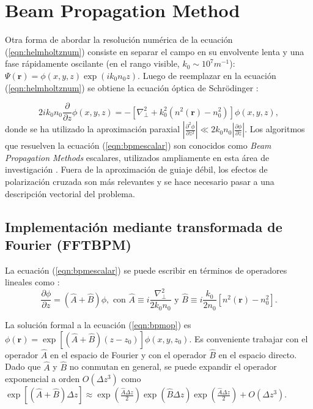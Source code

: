 \section{Beam Propagation Method} 

Otra forma de abordar la resolución numérica de la ecuación (\ref{eqn:helmholtznum}) consiste en separar el campo en su envolvente lenta y una fase rápidamente oscilante (en el rango visible, $k_0 \sim 10 ^{7} m^{-1}$): $\Psi(\textbf{r}) = \phi(x,y,z)\exp(ik_0 n_0 z)$. Luego de reemplazar en la ecuación (\ref{eqn:helmholtznum}) se obtiene la ecuación óptica de Schrödinger \citep{paraxialschrodinger}:

\begin{equation}
	2ik_0 n_0\frac{\partial }{\partial z}\phi(x,y, z) = - \left[\nabla_\perp^2 + k_0^2 (n^2(\textbf{r})-n_0^2)\right]\phi(x,y, z), \label{eqn:bpmescalar}
\end{equation} 
donde se ha utilizado la aproximación paraxial $\left| \frac{\partial^2 \phi}{\partial z^2} \right| \ll 2 k_0 n_0\left| \frac{\partial \phi}{\partial z} \right|$. Los algoritmos que resuelven la ecuación (\ref{eqn:bpmescalar}) son conocidos como \textit{Beam Propagation Methods} escalares, utilizados ampliamente en esta área de investigación \cite{bics, interorbital, OAMCaging, vortex, bpm}. Fuera de la aproximación de guiaje débil, los efectos de polarización cruzada son más relevantes y se hace necesario pasar a una descripción vectorial del problema.
\subsection{Implementación mediante transformada de Fourier (FFTBPM)}
La ecuación (\ref{eqn:bpmescalar}) se puede escribir en términos de operadores lineales como \citep{bpm}: 
\begin{equation}
	\frac{\partial \phi}{\partial z}  = \left(\hat{A} + \hat{B}\right)\phi, \text{ con } \hat{A} \equiv i\frac{\nabla^2_\perp}{2k_0n_0}\text{ y } \hat{B} \equiv i\frac{k_0}{2n_0}\left[n^2(\textbf{r})-n_0^2\right]. \label{eqn:bpmop}
\end{equation}

La solución formal a la ecuación (\ref{eqn:bpmop}) es $\phi(\textbf{r}) = \exp\left[\left(\hat{A} + \hat{B}\right)(z-z_0)\right]\phi(x, y, z_0)$. Es conveniente trabajar con el operador $\hat{A}$ en el espacio de Fourier y con el operador $\hat{B}$ en el espacio directo. Dado que $\hat{A}$ y $\hat{B}$ no conmutan en general, se puede expandir el operador exponencial a orden $O(\Delta z ^3)$ como $\exp\left[\left(\hat{A} + \hat{B}\right)\Delta z \right] \approx \exp\left(\frac{\hat{A}\Delta z}{2} \right)\exp\left(\hat{B}\Delta z \right)\exp\left(\frac{\hat{A}\Delta z}{2} \right) + O(\Delta z ^3)$.

